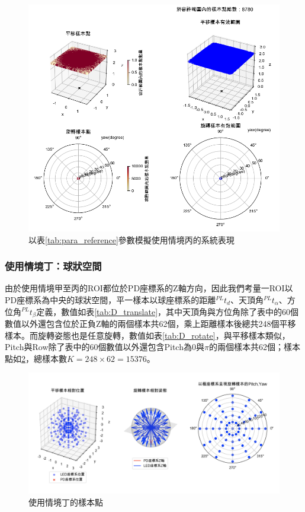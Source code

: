 \begin{figure}[htpb]
    \centering
    \includegraphics[width=15cm]{ch4pic/scene_c_solve.png}
    \caption{以表\ref{tab:para_reference}參數模擬使用情境丙的系統表現}
    \label{pic:scenario_c_solve}
\end{figure}


\subsubsection{使用情境丁：球狀空間}


由於使用情境甲至丙的ROI都位於PD座標系的Z軸方向，因此我們考量一ROI以PD座標系為中央的球狀空間，平一樣本以球座標系的距離$^{PL}t_d$、天頂角$^{PL}t_{\alpha}$、方位角$^{PL}t_{\beta}$定義，數值如表\ref{tab:D_translate}，其中天頂角與方位角除了表中的60個數值以外還包含位於正負Z軸的兩個樣本共62個，乘上距離樣本後總共248個平移樣本。而旋轉姿態也是任意旋轉，數值如表\ref{tab:D_rotate}，與平移樣本類似，Pitch與Row除了表中的60個數值以外還包含Pitch為0與$\pi$的兩個樣本共62個；樣本點如\ref{pic:d_scenario}，總樣本數$K=248 \times 62 = 15376$。

\begin{figure}[htpb]
    \centering
    \includegraphics[width=15cm]{ch4pic/d_scenario.png}
    \caption{使用情境丁的樣本點}
    \label{pic:d_scenario}
\end{figure}

